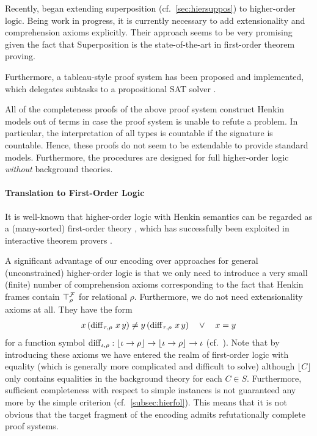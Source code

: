 \documentclass[a4paper,twoside,notitlepage,openright,11pt]{report}
\begin{document}
Recently, \cite{BBCW18} began extending superposition (cf.\ \cref{sec:hiersuppos}) to higher-order logic. Being work in progress, it is currently necessary to add extensionality and comprehension axioms explicitly. Their approach seems to be very promising given the fact that Superposition is the state-of-the-art in first-order theorem proving.

Furthermore, a tableau-style proof system has been proposed and implemented, which delegates subtasks to a propositional SAT solver \cite{B11}.

All of the completeness proofs of the above proof system construct Henkin models out of terms in case the proof system is unable to refute a problem. In particular, the interpretation of all types is countable if the signature is countable. Hence, these proofs do not seem to be extendable to provide standard models. Furthermore, the procedures are designed for full higher-order logic \emph{without} background theories.

\paragraph{Translation to First-Order Logic}
It is well-known that higher-order logic with Henkin semantics can be regarded as a (many-sorted) first-order theory \cite{BD83,K91}, which has successfully been exploited in interactive theorem provers \cite{BKPU16}.

A significant advantage of our encoding over approaches for general (unconstrained) higher-order logic is that we only need to introduce a very small (finite) number of comprehension axioms corresponding to the fact that Henkin frames contain $\top_\rho^\mathcal F$ for relational $\rho$. Furthermore, we do not need extensionality axioms at all. They have the form
\begin{align}
  \label{eq:extax}
  x\,(\operatorname{diff}_{\tau,\rho}\,x\,y)\neq y\,(\operatorname{diff}_{\tau,\rho}\,x\,y) \quad \lor \quad x=y
\end{align}
for a function symbol $\operatorname{diff}_{\iota,\rho}:\lfloor\iota\to\rho\rfloor\to \lfloor\iota\to\rho\rfloor\to\iota$ (cf.\ \cite{BBCW18}). Note that by introducing these axioms we have entered the realm of first-order logic with equality (which is generally more complicated and difficult to solve) although $\lfloor C\rfloor$ only contains equalities in the background theory for each $C\in S$. Furthermore, sufficient completeness with respect to simple instances is not guaranteed any more by the simple criterion (cf.\ \cref{subsec:hierfol}). This means that it is not obvious that the target fragment of the encoding admits refutationally complete proof systems.
\end{document}
